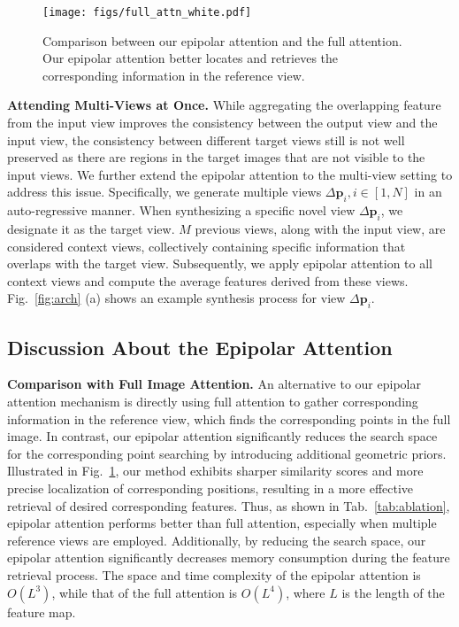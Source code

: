 \begin{figure}[t]
    \centering
    \texttt{[image: figs/full\_attn\_white.pdf]}
    \vspace{-5mm}
    \caption{Comparison between our epipolar attention and the full attention. Our epipolar attention better locates and retrieves the corresponding information in the reference view.}
    \label{fig:full_attn_compare}
    \vspace{-6mm}
\end{figure}


\noindent\textbf{Attending Multi-Views at Once.}
While aggregating the overlapping feature from the input view improves the consistency between the output view and the input view, the consistency between different target views still is not well preserved as there are regions in the target images that are not visible to the input views. 
We further extend the epipolar attention to the multi-view setting to address this issue. 
Specifically, we generate multiple views $\Delta\boldsymbol{p}_i, i \in [1, N]$ in an auto-regressive manner. 
When synthesizing a specific novel view $\Delta\boldsymbol{p}_i$, we designate it as the target view. $M$ previous views, along with the input view, are considered context views, collectively containing specific information that overlaps with the target view. 
Subsequently, we apply epipolar attention to all context views and compute the average features derived from these views.
Fig.~\ref{fig:arch} (a) shows an example synthesis process for view $\Delta\boldsymbol{p}_i$.

\subsection{Discussion About the Epipolar Attention}\label{sec:attn_analysis}



\textbf{Comparison with Full Image Attention.}
An alternative to our epipolar attention mechanism is directly using full attention to gather corresponding information in the reference view, which finds the corresponding points in the full image. In contrast, our epipolar attention significantly reduces the search space for the corresponding point searching by introducing additional geometric priors. Illustrated in Fig.~\ref{fig:full_attn_compare}, our method exhibits sharper similarity scores and more precise localization of corresponding positions, resulting in a more effective retrieval of desired corresponding features. 
Thus, as shown in Tab.~\ref{tab:ablation}, epipolar attention performs better than full attention, especially when multiple reference views are employed.
Additionally, by reducing the search space, our epipolar attention significantly decreases memory consumption during the feature retrieval process. The space and time complexity of the epipolar attention is $O(L^3)$, while that of the full attention is $O(L^4)$, where $L$ is the length of the feature map. 




